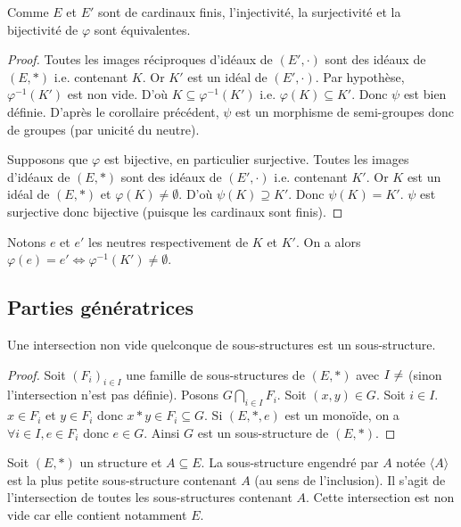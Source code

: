 \begin{remarque}
Comme $E$ et $E'$ sont de cardinaux finis, l'injectivité, la surjectivité et la
bijectivité de $\varphi$ sont équivalentes.
\end{remarque}

\begin{proof}
Toutes les images réciproques d'idéaux de $(E', \cdot)$ sont des idéaux de $(E, *)$ i.e. contenant $K$.
Or $K'$ est un idéal de $(E', \cdot)$.
Par hypothèse, $\varphi^{-1}(K')$ est non vide.
D'où $K \subseteq \varphi^{-1}(K')$ i.e. $\varphi(K) \subseteq K'$. Donc $\psi$ est bien définie.
D'après le corollaire précédent, $\psi$ est un morphisme de semi-groupes
donc de groupes (par unicité du neutre).

Supposons que $\varphi$ est bijective, en particulier surjective.
Toutes les images d'idéaux de $(E, *)$ sont des idéaux de $(E', \cdot)$ i.e.
contenant $K'$.
Or $K$ est un idéal de $(E, *)$ et $\varphi(K) \neq \emptyset$.
D'où $\psi(K) \supseteq K'$.
Donc $\psi(K) = K'$.
$\psi$ est surjective donc bijective (puisque les cardinaux sont finis).
\end{proof}

\begin{remarque}
Notons $e$ et $e'$ les neutres respectivement de $K$ et $K'$.
On a alors $\varphi(e) = e' \iff \varphi^{-1}(K') \neq \emptyset$.
\end{remarque}


\subsection{Parties génératrices}

\begin{proposition}
Une intersection non vide quelconque de sous-structures est un sous-structure.
\end{proposition}

\begin{proof}
Soit $\left(F_i\right)_{i \in I}$ une famille de sous-structures de $(E, *)$
avec $I \neq \empty$ (sinon l'intersection n'est pas définie).
Posons $G \bigcap_{i \in I} F_i$.
Soit $(x, y) \in G$. Soit $i \in I$.
$x \in F_i$ et $y \in F_i$ donc $x * y \in F_i \subseteq G$.
Si $(E, *, e)$ est un monoïde, on a $\forall i \in I, e \in F_i$ donc $e \in G$.
Ainsi $G$ est un sous-structure de $(E, *)$.
\end{proof}

\begin{definition}
Soit $(E, *)$ un structure et $A \subseteq E$.
La sous-structure engendré par $A$ notée $\langle A \rangle$ est
la plus petite sous-structure contenant $A$ (au sens de l'inclusion).
Il s'agit de l'intersection de toutes les sous-structures contenant $A$.
Cette intersection est non vide car elle contient notamment $E$.
\end{definition}

